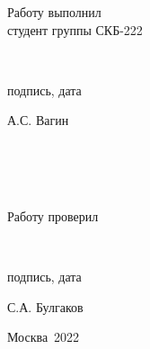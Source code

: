 \documentclass[a4paper, 12pt]{article}
\begin{document}
\begin{titlepage}
\begin{flushright}
\begin{minipage}[center]{15cm}
    \begin{minipage}[left]{5cm}
      {Работу выполнил\\студент группы СКБ-222}
    \end{minipage}
    \begin{minipage}[center]{5cm}
      \vspace{1.25cm}
      \hrulefill\\[-1cm]
      \begin{center}{подпись, дата}\end{center}
    \end{minipage}
    \begin{minipage}[right]{4cm}
      \vspace{0.4cm}
      \begin{flushright}{А.С. Вагин}\end{flushright}
    \end{minipage}
    \\
    \\
    \\
    \begin{minipage}[left]{5cm}
      {Работу проверил}
    \end{minipage}
    \begin{minipage}[center]{5cm}
      \vspace{1.25cm}
      \hrulefill\\[-1cm]
      \begin{center}{подпись, дата}\end{center}
    \end{minipage}
    \begin{minipage}[right]{4cm}
      \begin{flushright}{С.А. Булгаков}\end{flushright}
    \end{minipage}
  \end{minipage}
\end{flushright}

\vspace{\fill}

\begin{center}
Москва~2022
\end{center}
\end{titlepage}
\setcounter{page}{2}
\setcounter{secnumdepth}{5}
\setcounter{tocdepth}{5}

\tableofcontents
\cleardoublepage

\setcounter{section}{1}
\graphicspath{ {./images/} }
\end{document}
